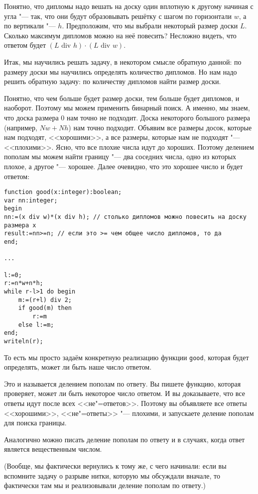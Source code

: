 Понятно, что дипломы надо вешать на доску один вплотную к другому 
начиная с угла "--- так, что они будут образовывать решётку с шагом
по горизонтали $w$, а по вертикали "--- $h$.
Предположим, что мы выбрали некоторый размер доски $L$.
Сколько максимум дипломов можно на неё повесить?
Несложно видеть, что ответом будет $(L\mbox{ div }h)\cdot(L\mbox{ div }w)$.

Итак, мы научились решать задачу, в некотором смысле обратную данной:
по размеру доски мы научились определять количество дипломов.
Но нам надо решить обратную задачу: по количеству дипломов найти размер доски.

Понятно, что чем больше будет размер доски, тем больше будет
дипломов, и наоборот. 
Поэтому мы можем применить бинарный поиск. 
А именно, мы знаем, что доска размера 0 нам точно не подходит.
Доска некоторого большого размера (например, $Nw+Nh$) нам точно подходит.
Объявим все размеры досок, которые нам подходят, <<хорошими>>,
а все размеры, которые нам не подходят "--- <<плохими>>.
Ясно, что все плохие числа идут до хороших.
Поэтому делением пополам мы можем найти границу "--- два соседних числа,
одно из которых плохое, а другое "--- хорошее.
Далее очевидно, что это хорошее число и будет ответом:
\begin{codesampleo}\begin{verbatim}
function good(x:integer):boolean;
var nn:integer;
begin
nn:=(x div w)*(x div h); // столько дипломов можно повесить на доску размера x
result:=nn>=n; // если это >= чем общее число дипломов, то да
end;

...

l:=0;
r:=n*w+n*h;  
while r-l>1 do begin    
    m:=(r+l) div 2;
    if good(m) then
        r:=m
    else l:=m;
end;
writeln(r);
\end{verbatim}
\end{codesampleo}

То есть мы просто задаём конкретную реализацию функции \verb`good`,
которая будет определять, может ли быть наше число ответом.

Это и называется делением пополам по ответу. 
Вы пишете функцию, которая проверяет, может ли быть некоторое число ответом.
И вы доказываете, что все ответы идут после всех <<не"=ответов>>.
Поэтому вы объявляете все ответы <<хорошими>>, <<не"=ответы>> "--- плохими,
и запускаете деление пополам для поиска границы.

Аналогично можно писать деление пополам по ответу и в случаях, когда ответ является
вещественным числом.

(Вообще, мы фактически вернулись к тому же, с чего начинали: если вы вспомните
задачу о разрыве нитки, которую мы обсуждали вначале, то фактически там мы
и реализовывали деление пополам по ответу.)
